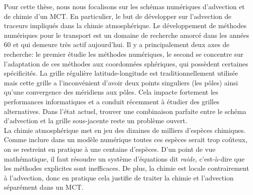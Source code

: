 Pour cette thèse, nous nous focalisons sur les schémas numériques d'advection et
de chimie d'un MCT. En particulier, le but \DIFdelbegin {}\DIFdelend \DIFaddbegin {}\DIFaddend de développer \DIFdelbegin {}\DIFdelend \DIFaddbegin {}\DIFaddend sur l'advection de traceurs impliqués dans
la chimie atmosphérique.  Le développement de méthodes numériques pour le
transport est un domaine de recherche amorcé dans les années 60 et qui demeure
très actif aujourd'hui. Il y a principalement deux axes de recherche: le premier
étudie les méthodes numériques, le second se concentre sur l'adaptation de ces
méthodes aux coordonnées sphériques, qui possèdent certaines spécificités. La
grille régulière latitude-longitude est traditionnellement utilisée mais cette
grille a l'inconvénient d'avoir deux points singuliers (les pôles) ainsi qu'une
convergence des méridiens aux pôles. Cela impacte fortement les performances
informatiques et a conduit récemment à étudier des grilles alternatives.  Dans
l'état actuel, trouver une combinaison parfaite entre le schéma d'advection et
la grille sous-jacente reste un problème ouvert. \\ 
La chimie atmosphérique met en jeu des dizaines de milliers d'espèces chimiques.
Comme inclure dans un modèle numérique toutes ces espèces serait trop coûteux,
on se restreint en pratique à une centaine d'espèces. D'un point de vue
mathématique, il faut résoudre un système d'équations dit \textit{raide},
c'est-à-dire que les méthodes explicites sont inefficaces. De plus, la chimie
est locale contrairement à l'advection, donc en pratique cela justifie de
traiter la chimie et l'advection séparément dans un MCT.

